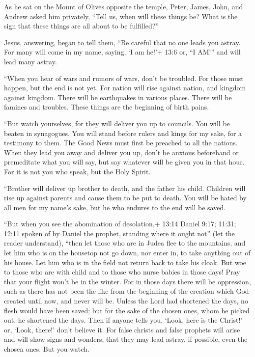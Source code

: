  As he sat on the Mount of Olives opposite the temple,
Peter, James, John, and Andrew asked him privately,  ``Tell
us, when will these things be? What is the sign that these things are
all about to be fulfilled?''

 Jesus, answering, began to tell them, ``Be careful that no
one leads you astray.  For many will come in my name,
saying, `I am he!'+ 13:6 or, ``I AM!'' and will lead many astray.

 ``When you hear of wars and rumors of wars, don't be
troubled. For those must happen, but the end is not yet. 
For nation will rise against nation, and kingdom against kingdom. There
will be earthquakes in various places. There will be famines and
troubles. These things are the beginning of birth pains.

 ``But watch yourselves, for they will deliver you up to
councils. You will be beaten in synagogues. You will stand before rulers
and kings for my sake, for a testimony to them.  The Good
News must first be preached to all the nations.  When they
lead you away and deliver you up, don't be anxious beforehand or
premeditate what you will say, but say whatever will be given you in
that hour. For it is not you who speak, but the Holy Spirit.

 ``Brother will deliver up brother to death, and the father
his child. Children will rise up against parents and cause them to be
put to death.  You will be hated by all men for my name's
sake, but he who endures to the end will be saved.

 ``But when you see the abomination of desolation,+ 13:14
Daniel 9:17; 11:31; 12:11 spoken of by Daniel the prophet, standing
where it ought not'' (let the reader understand), ``then let those who
are in Judea flee to the mountains,  and let him who is on
the housetop not go down, nor enter in, to take anything out of his
house.  Let him who is in the field not return back to take
his cloak.  But woe to those who are with child and to
those who nurse babies in those days!  Pray that your
flight won't be in the winter.  For in those days there
will be oppression, such as there has not been the like from the
beginning of the creation which God created until now, and never will
be.  Unless the Lord had shortened the days, no flesh would
have been saved; but for the sake of the chosen ones, whom he picked
out, he shortened the days.  Then if anyone tells you,
`Look, here is the Christ!' or, `Look, there!' don't believe it.
 For false christs and false prophets will arise and will
show signs and wonders, that they may lead astray, if possible, even the
chosen ones.  But you watch.

